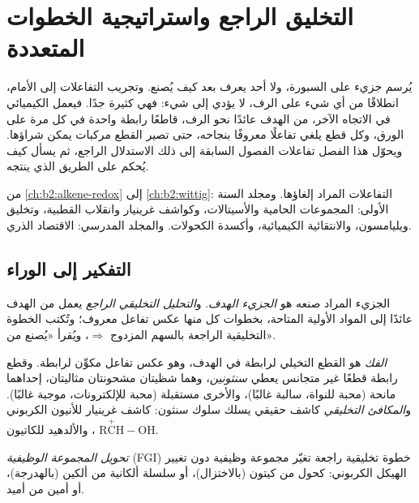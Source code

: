 \chapter{التخليق الراجع واستراتيجية الخطوات المتعددة}\label{ch:b2:retrosynthesis}

يُرسم جزيء على السبورة، ولا أحد يعرف بعد كيف يُصنع. وتجريب التفاعلات إلى الأمام، انطلاقًا من
أي شيء على الرف، لا يؤدي إلى شيء: فهي كثيرة جدًا. فيعمل الكيميائي في الاتجاه الآخر، من
الهدف عائدًا نحو الرف، قاطعًا رابطة واحدة في كل مرة على الورق، وكل قطع يلغي تفاعلًا
معروفًا بنجاحه، حتى تصير القطع مركبات يمكن شراؤها. ويحوّل هذا الفصل تفاعلات
الفصول السابقة إلى ذلك الاستدلال الراجع، ثم يسأل كيف يُحكم على الطريق الذي ينتجه.

\begin{recall}
من \cref{ch:b2:alkene-redox} إلى \cref{ch:b2:wittig}: التفاعلات المراد إلغاؤها. ومجلد السنة الأولى:
المجموعات الحامية والأسيتالات، وكواشف غرينيار وانقلاب القطبية، وتخليق ويليامسون،
والانتقائية الكيميائية، وأكسدة الكحولات. والمجلد المدرسي: الاقتصاد الذري.
\end{recall}

\section{التفكير إلى الوراء}

\begin{definition}\label{def:b2:retrosynthesis:analysis}
الجزيء المراد صنعه هو \emph{الجزيء الهدف}. و\emph{التحليل التخليقي الراجع}
 يعمل من الهدف عائدًا إلى المواد الأولية المتاحة،
بخطوات كل منها عكس تفاعل معروف؛ وتُكتب الخطوة التخليقية الراجعة بالسهم
المزدوج $\Rightarrow$، ويُقرأ «يُصنع من».
\end{definition}

\begin{definition}\label{def:b2:retrosynthesis:disconnection}
\emph{الفك} هو القطع التخيلي لرابطة في الهدف، وهو
عكس تفاعل مكوِّن لرابطة. وقطع رابطة قطعًا غير متجانس يعطي \emph{سنثونين}،
وهما شظيتان مشحونتان مثاليتان، إحداهما مانحة (محبة للنواة، سالبة غالبًا)، والأخرى مستقبلة
(محبة للإلكترونات، موجبة غالبًا). و\emph{المكافئ التخليقي} كاشف
حقيقي يسلك سلوك سنثون: كاشف غرينيار للأنيون الكربوني ، والألدهيد
للكاتيون $\mathrm{R\overset{+}{C}H{-}OH}$.
\end{definition}

\begin{definition}\label{def:b2:retrosynthesis:fgi}
\emph{تحويل المجموعة الوظيفية} (FGI) خطوة
تخليقية راجعة تغيّر مجموعة وظيفية دون تغيير الهيكل الكربوني: كحول
من كيتون (بالاختزال)، أو سلسلة ألكانية من ألكين (بالهدرجة)، أو أمين من أميد.
\end{definition}

